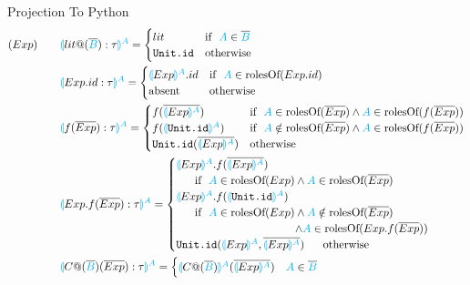 \documentclass[11pt]{jarticle}
\newcommand{\projection}[2]{{\color{cyan}\llparenthesis}#1{\color{cyan}\rrparenthesis^#2}}
\begin{document}
Projection To Python
\begin{alignat*}{2}
  &(Exp)~~~ &&\projection{lit@(\overline{\color{cyan}{B}}):\tau}{A}=
  \begin{cases}
    lit & \text{if}~~ {\color{cyan}A} \in \overline{\color{cyan}{B}}\\
    \texttt{Unit.id} &\text{otherwise}
  \end{cases}\\
  &&&\projection{Exp.id:\tau}{A}=
  \begin{cases}
    \projection{Exp}{A}.id &\text{if}~~{\color{cyan}A} \in \text{rolesOf} (Exp.id)\\
    \text{absent} &\text{otherwise}
  \end{cases}\\
  &&&\projection{f(\overline{Exp}):\tau}{A} =
  \begin{cases}
    f(\overline{\projection{Exp}{A}}) &\text{if}~~ {\color{cyan}A} \in \text{rolesOf} (\overline{Exp}) \wedge {\color{cyan}A} \in \text{rolesOf} (f(\overline{Exp}))\\
    f(\projection{\texttt{Unit.id}}{A}) &\text{if}~~ {\color{cyan}A} \notin \text{rolesOf}(\overline{Exp}) \wedge {\color{cyan}A} \in \text{rolesOf} (f(\overline{Exp}))\\
    \texttt{Unit.id}(\overline{\projection{Exp}{A}}) &\text{otherwise}
  \end{cases}\\
  &&&\projection{Exp.f(\overline{Exp}):\tau}{A}=
  \begin{cases}
    \projection{Exp}{A}.f(\overline{\projection{Exp}{A}}) \\
    ~~~~~\text{if}~~ {\color{cyan}A} \in \text{rolesOf}(Exp) \wedge {\color{cyan}A} \in \text{rolesOf}(\overline{Exp})\\
    \projection{Exp}{A}.f(\projection{\texttt{Unit.id}}{A}) \\
    ~~~~~\text{if}~~ {\color{cyan}A} \in \text{rolesOf}(Exp) \wedge {\color{cyan}A} \notin \text{rolesOf}(\overline{Exp}) \\
    ~~~~~~~~~~~~~~~~~~~~~~~~~~~~~~~~\wedge {\color{cyan}A} \in \text{rolesOf}(Exp.f(\overline{Exp}))\\
    \texttt{Unit.id}(\projection{Exp}{A},\overline{\projection{Exp}{A}}) ~~~~~\text{otherwise}
  \end{cases}\\
  &&&\projection{C@(\overline{\color{cyan}B})(\overline{Exp}):\tau}{A}=
  \begin{cases}
    \projection{C@(\overline{\color{cyan}B})}{A} (\overline{\projection{Exp}{A}}) & {\color{cyan}A} \in \overline{\color{cyan}B}\\

\end{cases}
\end{alignat*}
\end{document}
